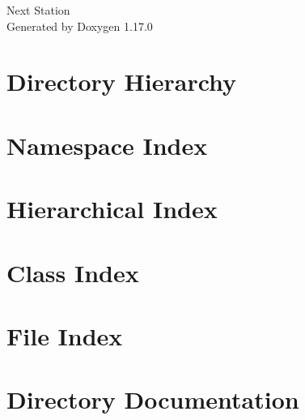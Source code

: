 \documentclass[twoside]{book}
\newcommand{\+}{\discretionary{\mbox{\scriptsize$\hookleftarrow$}}{}{}}
\newcommand{\clearemptydoublepage}{%
    \newpage{\pagestyle{empty}\cleardoublepage}%
  }
\begin{document}
  \raggedbottom
    \hypersetup{pageanchor=false,
                bookmarksnumbered=true,
                pdfencoding=unicode
               }
  \begin{titlepage}
  \vspace*{7cm}
  \begin{center}%
  {\Large Next Station}\\
  \vspace*{1cm}
  {\large Generated by Doxygen 1.17.0}\\
  \end{center}
  \end{titlepage}
  \clearemptydoublepage
  \tableofcontents
  \clearemptydoublepage
  \hypersetup{pageanchor=true}
\chapter{Directory Hierarchy}

\chapter{Namespace Index}

\chapter{Hierarchical Index}

\chapter{Class Index}

\chapter{File Index}

\chapter{Directory Documentation}









\end{document}
